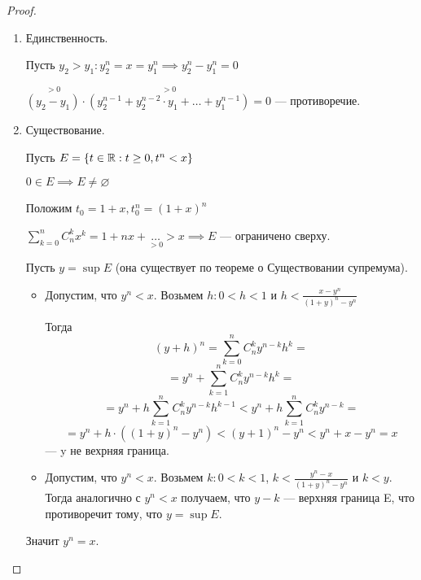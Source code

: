 \begin{proof}
    \begin{enumerate}
        \item Единственность.
        
        Пусть $y_2 > y_1: y^{n}_{2} = x = y^{n}_{1} \implies y^{n}_{2} - y^{n}_{1} = 0$

        $\overset{> 0}{(y_2 - y_1)} \cdot \overset{> 0}{(y^{n-1}_{2} + y^{n-2}_{2} \cdot y_1 + \ldots + y^{n-1}_{1})} = 0$ --- противоречие.


        \item Существование.
        
        Пусть $E = \{t \in \mathbb{R}: t \geq 0, t^n < x\}$

        $0 \in E \implies E \neq \varnothing$

        Положим $t_0 = 1 + x, t_{0}^{n} = (1 + x)^n$

        $\sum_{k = 0}^{n} C_{n}^{k} x^k = 1 + nx + \underset{> 0}{\dots} > x \implies E$ --- ограничено сверху.

        Пусть $y = \sup E$ (она существует по теореме о Существовании супремума). 
        
        \begin{itemize}
        
            \item Допустим, что $y^n < x$. Возьмем $h: 0 < h < 1$ и $h < \frac{x - y^{n}}{(1+y)^{n} - y^n}$
            
            Тогда \[(y + h)^n = \sum^{n}_{k = 0} C_{n}^{k} y^{n - k}h^{k} = \]
            \[ =y^n + \sum^{n}_{k = 1} C_{n}^{k} y^{n - k}h^{k} = \] 
            \[ =y^n + h\sum^{n}_{k = 1} C_{n}^{k} y^{n - k}h^{k-1} < y^n + h \sum_{k = 1}^{n} C_{n}^{k}y^{n-k} = \] 
            \[ =y^n + h \cdot ((1 + y)^n - y^n) <(y + 1)^n - y^n < y^n + x - y^n = x\] --- y не вехрняя граница.

            \item Допустим, что $y^n < x$. Возьмем $k: 0 < k < 1$, 
            $k < \frac{y^{n} - x}{(1 + y)^{n} - y^{n}}$ и  $k < y$. Тогда аналогично с $y^n < x$ получаем, что $y - k$ --- верхняя граница E, что противоречит тому, что $y = \sup E$. 
        \end{itemize}
        Значит $y^n = x$.
    \end{enumerate}
\end{proof}
